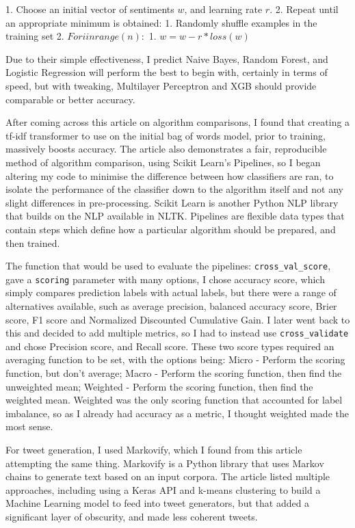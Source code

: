 \documentclass{article}
\begin{document}
1.
Choose an initial vector of sentiments $w$, and learning rate $r$.
2.
Repeat until an appropriate minimum is obtained:
1.
Randomly shuffle examples in the training set
2.
$For i in range(n):$
1.
$w = w - r*loss(w)$

Due to their simple effectiveness, I predict Naive Bayes, Random Forest, and Logistic Regression will perform the best to begin with, certainly in terms of speed, but with tweaking, Multilayer Perceptron and XGB should provide comparable or better accuracy.

After coming across this article\autocite[9]{nag_2019} on algorithm comparisons, I found that creating a tf-idf transformer to use on the initial bag of words model, prior to training, massively boosts accuracy.
The article also demonstrates a fair, reproducible method of algorithm comparison, using Scikit Learn's Pipelines, so I began altering my code to minimise the difference between how classifiers are ran, to isolate the performance of the classifier down to the algorithm itself and not any slight differences in pre-processing.
Scikit Learn is another Python NLP library that builds on the NLP available in NLTK.
Pipelines are flexible data types that contain steps which define how a particular algorithm should be prepared, and then trained.

The function that would be used to evaluate the pipelines: \lstinline{cross_val_score}, gave a \lstinline{scoring} parameter with many options\autocite[5]{scikit}, I chose accuracy score, which simply compares prediction labels with actual labels, but there were a range of alternatives available, such as average precision, balanced accuracy score, Brier score, F1 score and Normalized Discounted Cumulative Gain.
I later went back to this and decided to add multiple metrics, so I had to instead use \lstinline{cross_validate} and chose Precision score, and Recall score.
These two score types required an averaging function to be set, with the options being: Micro - Perform the scoring function, but don't average; Macro - Perform the scoring function, then find the unweighted mean; Weighted - Perform the scoring function, then find the weighted mean.
Weighted was the only scoring function that accounted for label imbalance, so as I already had accuracy as a metric, I thought weighted made the most sense.

For tweet generation, I used Markovify\autocite[9]{jsvine_2020}, which I found from this article\autocite[9]{hall_2017} attempting the same thing.
Markovify is a Python library that uses Markov chains to generate text based on an input corpora.
The article listed multiple approaches, including using a Keras API and k-means clustering to build a Machine Learning model to feed into tweet generators, but that added a significant layer of obscurity, and made less coherent tweets.
\end{document}
